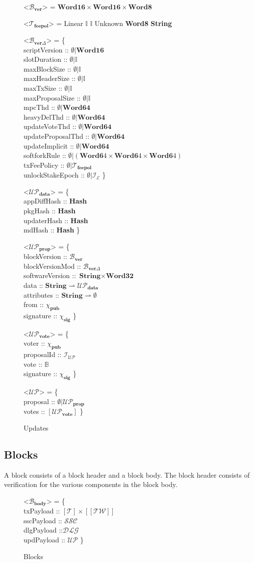 \documentclass{article}
\def\fld{\\\llap{,\quad}}%
\newcommand{\rhu}{\rightharpoonup}
\newcommand{\lists}[1]{\left[{#1}\right]}
\newcommand{\maybe}[1]{\emptyset | {#1}}
\newcommand{\idsof}[1]{\mathcal{I}\!_#1}
\newcommand{\epochids}{\idsof{\mathcal{E}}}
\newcommand{\updids}{\idsof{\mathcal{UP}}}
\newcommand{\pubkey}{\chi_{\textbf{pub}}}
\newcommand{\signature}{\chi_{\textbf{sig}}}
\newcommand{\txs}{\mathcal{T}}
\newcommand{\txfeepol}{\txs_{\textbf{feepol}}}
\newcommand{\twit}{\mathcal{TW}}
\newcommand{\ssc}{\mathcal{SSC}}
\newcommand{\dlg}{\mathcal{DLG}}
\newcommand{\upd}{\mathcal{UP}}
\newcommand{\updprop}{\upd_{\textbf{prop}}}
\newcommand{\upddata}{\upd_{\textbf{data}}}
\newcommand{\updvote}{\upd_{\textbf{vote}}}
\newcommand{\blocks}{\mathcal{B}}
\newcommand{\blockver}{\blocks_{\textbf{ver}}}
\newcommand{\blockvermod}{\blocks_{\textbf{ver}\Delta}}
\newcommand{\bbodies}{\blocks_{\textbf{body}}}
\newcommand{\hstype}[1]{\textbf{#1}}
\newcommand{\String}{\hstype{String}}
\newcommand{\Word}[1]{\hstype{Word#1}}
\newcommand{\hash}{\hstype{Hash}}
\newcommand{\Integer}{\mathbb{I}}
\newcommand{\Bool}{\mathbb{B}}
\begin{document}
\begin{figure}[H]
  \begin{grammar}
    <$\blockver$> = $\Word{16}\times\Word{16}\times\Word{8}$

    <$\txfeepol$> = Linear $\Integer$ $\Integer$
    \alt Unknown \Word{8} \String

    <$\blockvermod$> = \{
    \fld scriptVersion     :: $\maybe{\Word{16}}$
    \fld slotDuration      :: $\maybe{\Integer}$
    \fld maxBlockSize      :: $\maybe{\Integer}$
    \fld maxHeaderSize     :: $\maybe{\Integer}$
    \fld maxTxSize         :: $\maybe{\Integer}$
    \fld maxProposalSize   :: $\maybe{\Integer}$
    \fld mpcThd            :: $\maybe{\Word{64}}$
    \fld heavyDelThd       :: $\maybe{\Word{64}}$
    \fld updateVoteThd     :: $\maybe{\Word{64}}$
    \fld updateProposalThd :: $\maybe{\Word{64}}$
    \fld updateImplicit    :: $\maybe{\Word{64}}$
    \fld softforkRule      :: $\maybe{(\Word64\times\Word64\times\Word64)}$
    \fld txFeePolicy       :: $\maybe{\txfeepol}$
    \fld unlockStakeEpoch  :: $\maybe{\epochids}$
    \}

    <$\upddata$> = \{
    \fld appDiffHash :: \hash
    \fld pkgHash :: \hash
    \fld updaterHash :: \hash
    \fld mdHash :: \hash
    \}

    <$\updprop$> = \{
    \fld blockVersion :: $\blockver$
    \fld blockVersionMod :: $\blockvermod$
    \fld softwareVersion :: $\String \times \Word{32}$
    \fld data :: $\String \rhu \upddata$
    \fld attributes :: $\String \rhu \emptyset$
    \fld from :: $\pubkey$
    \fld signature :: $\signature$
    \}

    <$\updvote$> = \{
    \fld voter :: $\pubkey$
    \fld proposalId :: $\updids$
    \fld vote :: $\Bool$
    \fld signature :: $\signature$
    \}

    <$\upd$> = \{
    \fld proposal :: $\maybe{\updprop}$
    \fld votes :: $\lists{\updvote}$
    \}
  \end{grammar}
  \caption{Updates}
  \label{fig:updtypes}
\end{figure}
\subsection{Blocks}

A block consists of a block header and a block body. The block header consists
of verification for the various components in the block body.

\begin{figure}[H]
  \caption{Blocks}
  \label{fig:block}
  \begin{grammar}
    <$\bbodies$> = \{
    \fld txPayload :: $\lists{\txs}\times\lists{\lists{\twit}}$
    \fld sscPayload :: $\ssc$
    \fld dlgPayload ::$\dlg$
    \fld updPayload :: $\upd$
    \}
  \end{grammar}
\end{figure}
\end{document}
